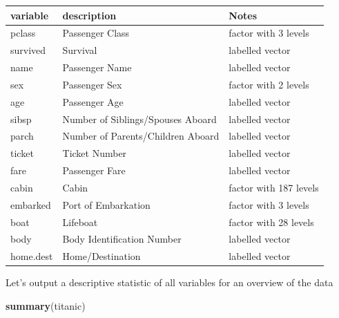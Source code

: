 \documentclass[12,]{article}
\newenvironment{Shaded}{\begin{snugshade}}{\end{snugshade}}
\newcommand{\KeywordTok}[1]{\textcolor[rgb]{0.13,0.29,0.53}{\textbf{{#1}}}}
\newcommand{\NormalTok}[1]{{#1}}
\begin{document}
\begin{longtable}[]{@{}lll@{}}
\toprule
\textbf{variable} & \textbf{description} & \textbf{Notes}\tabularnewline
\midrule
\endhead
pclass & Passenger Class & factor with 3 levels\tabularnewline
survived & Survival & labelled vector\tabularnewline
name & Passenger Name & labelled vector\tabularnewline
sex & Passenger Sex & factor with 2 levels\tabularnewline
age & Passenger Age & labelled vector\tabularnewline
sibsp & Number of Siblings/Spouses Aboard & labelled
vector\tabularnewline
parch & Number of Parents/Children Aboard & labelled
vector\tabularnewline
ticket & Ticket Number & labelled vector\tabularnewline
fare & Passenger Fare & labelled vector\tabularnewline
cabin & Cabin & factor with 187 levels\tabularnewline
embarked & Port of Embarkation & factor with 3 levels\tabularnewline
boat & Lifeboat & factor with 28 levels\tabularnewline
body & Body Identification Number & labelled vector\tabularnewline
home.dest & Home/Destination & labelled vector\tabularnewline
\bottomrule
\end{longtable}

Let's output a descriptive statistic of all variables for an overview of
the data

\begin{Shaded}
\begin{Highlighting}[]
\KeywordTok{summary}\NormalTok{(titanic)}
\end{Highlighting}
\end{Shaded}
\end{document}
